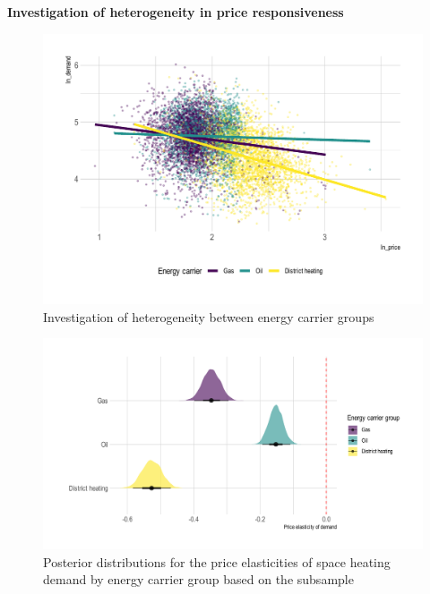 \documentclass[12pt,twoside]{reedthesis}
\begin{document}
\textbf{Investigation of heterogeneity in price responsiveness}
\begin{figure}

{\centering \includegraphics[width=1\linewidth]{figure/carrier_heterogeneity_plot} 

}

\caption{Investigation of heterogeneity between energy carrier groups}\label{fig:heterogeneity-energy-carrier-plot}
\end{figure}
\begin{figure}

{\centering \includegraphics[width=1\linewidth]{figure/posterior-distribution-interaction} 

}

\caption{Posterior distributions for the price elasticities of space heating demand by energy carrier group based on the subsample}\label{fig:posterior-distribution-interaction}
\end{figure}
\end{document}
